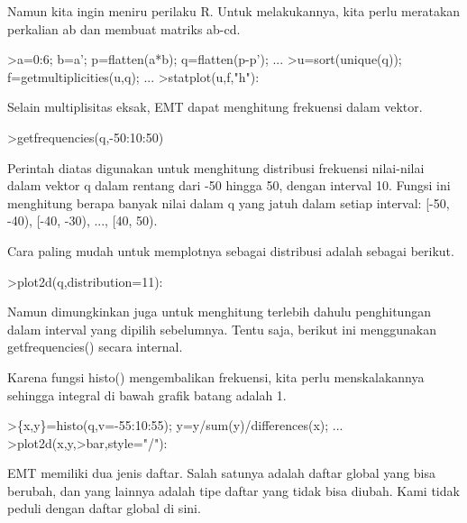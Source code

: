 \documentclass{article}
\begin{document}
\begin{eulernotebook}
\begin{eulercomment}
\begin{eulercomment}
\begin{eulercomment}
\begin{eulercomment}
\begin{eulercomment}
\begin{eulercomment}
\begin{eulercomment}
\begin{eulercomment}
\begin{eulercomment}
\begin{eulercomment}
\begin{eulercomment}
Namun kita ingin meniru perilaku R. Untuk melakukannya, kita perlu
meratakan perkalian ab dan membuat matriks ab-cd.
\end{eulercomment}
\begin{eulerprompt}
>a=0:6; b=a'; p=flatten(a*b); q=flatten(p-p'); ...
>u=sort(unique(q)); f=getmultiplicities(u,q); ...
>statplot(u,f,"h"):
\end{eulerprompt}
\begin{eulercomment}
Selain multiplisitas eksak, EMT dapat menghitung frekuensi dalam
vektor.
\end{eulercomment}
\begin{eulerprompt}
>getfrequencies(q,-50:10:50)
\end{eulerprompt}
\begin{euleroutput}
  [0,  23,  132,  316,  602,  801,  333,  141,  53,  0]
\end{euleroutput}
\begin{eulercomment}
Perintah diatas digunakan untuk menghitung distribusi frekuensi
nilai-nilai dalam vektor q dalam rentang dari -50 hingga 50, dengan
interval 10. Fungsi ini menghitung berapa banyak nilai dalam q yang
jatuh dalam setiap interval: [-50, -40), [-40, -30), ..., [40, 50).

Cara paling mudah untuk memplotnya sebagai distribusi adalah sebagai
berikut.
\end{eulercomment}
\begin{eulerprompt}
>plot2d(q,distribution=11):
\end{eulerprompt}
\begin{eulercomment}
Namun dimungkinkan juga untuk menghitung terlebih dahulu penghitungan
dalam interval yang dipilih sebelumnya. Tentu saja, berikut ini
menggunakan getfrequencies() secara internal.

Karena fungsi histo() mengembalikan frekuensi, kita perlu
menskalakannya sehingga integral di bawah grafik batang adalah 1.
\end{eulercomment}
\begin{eulerprompt}
>\{x,y\}=histo(q,v=-55:10:55); y=y/sum(y)/differences(x); ...
>plot2d(x,y,>bar,style="/"):
\end{eulerprompt}
\begin{eulercomment}
\begin{eulercomment}
\begin{eulercomment}
EMT memiliki dua jenis daftar. Salah satunya adalah daftar global yang
bisa berubah, dan yang lainnya adalah tipe daftar yang tidak bisa
diubah. Kami tidak peduli dengan daftar global di sini.


\end{eulercomment}
\end{eulercomment}
\end{eulercomment}
\end{eulercomment}
\end{eulercomment}
\end{eulercomment}
\end{eulercomment}
\end{eulercomment}
\end{eulercomment}
\end{eulercomment}
\end{eulercomment}
\end{eulercomment}
\end{eulercomment}
\end{eulernotebook}
\end{document}
